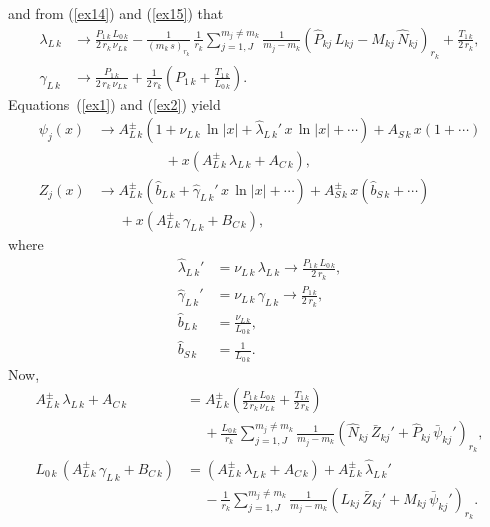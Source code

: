 \documentclass[12pt,prb,aps,notitlepage]{revtex4-1}
\begin{document}
and from (\ref{ex14}) and (\ref{ex15}) that
\begin{align}
\lambda_{L\,k}&\rightarrow \frac{P_{1\,k}\,L_{0\,k}}{2\,r_k\,\nu_{L\,k}} -
\frac{1}{(m_k\,s)_{r_k}}\,\frac{1}{r_k}\sum_{j=1,J}^{m_j\neq m_k}
\frac{1}{m_j-m_k}\left(\hat{P}_{kj}\, L_{kj}- M_{kj}\,\hat{N}_{kj}\right)_{r_k}+ \frac{T_{1\,k}}{2\,r_k},\\[0,5ex]
\gamma_{L\,k}&\rightarrow \frac{P_{1\,k}}{2\,r_k\,\nu_{L\,k}}+\frac{1}{2\,r_k}\left(
P_{1\,k} + \frac{T_{1\,k}}{L_{0\,k}} \right).
\end{align}
Equations~(\ref{ex1}) and (\ref{ex2}) yield
\begin{align}
\psi_j(x)&\rightarrow A_{L\,k}^{\pm}\left(1+\nu_{L\,k}\,\ln|x| + \hat{\lambda}_{L\,k}'\,x\,\ln|x|+\cdots\right)
+A_{S\,k}\,x\left(1+\cdots\right) \nonumber\\[0.5ex]
&\phantom{rightarrow}+x \left(A_{L\,k}^\pm\,\lambda_{L\,k} + A_{C\,k}\right),\\[0.5ex]
Z_j(x)&\rightarrow A_{L\,k}^\pm\left(\hat{b}_{L\,k}+\hat{\gamma}_{L\,k}'\,x\,\ln|x|+\cdots\right)
+A_{S\,k}^{\pm}\,x\left(\hat{b}_{S\,k}+\cdots\right)\nonumber\\[0.5ex]
&\phantom{\rightarrow} +x\left(A_{L\,k}^\pm\,\gamma_{L\,k} + B_{C\,k}\right),
\end{align}
where
\begin{align}
\hat{\lambda}_{L\,k}'&=\nu_{L\,k}\,\lambda_{L\,k}\rightarrow \frac{P_{1\,k}\,L_{0\,k}}{2\,r_k},\\[0.5ex]
\hat{\gamma}_{L\,k}' &= \nu_{L\,k}\,\gamma_{L\,k}\rightarrow \frac{P_{1\,k}}{2\,r_k},\\[0.5ex]
\hat{b}_{L\,k} &= \frac{\nu_{L\,k}}{L_{0\,k}},\\[0.5ex]
\hat{b}_{S\,k} &= \frac{1}{L_{0\,k}}.
\end{align}
Now,
\begin{align}\label{e41}
A_{L\,k}^\pm\,\lambda_{L\,k} + A_{C\,k} &= A_{L\,k}^\pm\left(\frac{P_{1\,k}\,L_{0\,k}}{2\,r_k\,\nu_{L\,k}}
+\frac{T_{1\,k}}{2\,r_k}\right)\nonumber\\[0.5ex]&\phantom{+}+\frac{L_{0\,k}}{r_k}\sum_{j=1,J}^{m_j\neq m_k}
\frac{1}{m_j-m_k}\left(\hat{N}_{kj}\, \bar{Z}_{kj}'+ \hat{P}_{kj}\,\bar{\psi}_{kj}'\right)_{r_k},\\[0.5ex]
L_{0\,k}\,(A_{L\,k}^\pm\,\gamma_{L\,k}+B_{C\,k}) &= (A_{L\,k}^\pm\,\lambda_{L\,k} + A_{C\,k})
+A_{L\,k}^\pm\,\hat{\lambda}_{L\,k}'\nonumber\\[0.5ex]
&\phantom{+} - \frac{1}{r_k}\sum_{j=1,J}^{m_j\neq m_k}
\frac{1}{m_j-m_k}\left(L_{kj}\,\bar{Z}_{kj}' + M_{kj}\,\bar{\psi}_{kj}'\right)_{r_k}.
\end{align}
\end{document}
